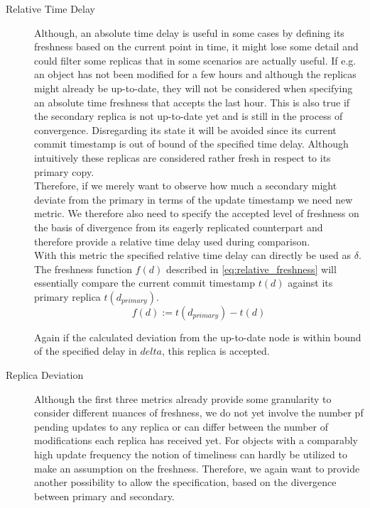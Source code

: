 \begin{description}
    \item [Relative Time Delay] 
    Although, an absolute time delay is useful in some cases by defining its freshness based on the current point in time, 
    it might lose some detail and could filter some replicas that in some scenarios are actually useful.
    If e.g. an object has not been modified for a few hours and although the replicas might already be up-to-date, they will not be considered when specifying 
    an absolute time freshness that accepts the last hour.
    This is also true if the secondary replica is not up-to-date yet and is still in the process of convergence.
    Disregarding its state it will be avoided since its current commit timestamp is out of bound of the specified time delay.
    Although intuitively these replicas are considered rather fresh in respect to its primary copy.\\
    Therefore, if we merely want to observe how much a secondary might deviate from the primary in terms of the update timestamp we need new metric.
    We therefore also need to specify the accepted level of freshness on the basis of divergence from its eagerly replicated counterpart and therefore provide a relative time delay
    used during comparison.\\
    With this metric the specified relative time delay can directly be used as $\delta$. The freshness function $f(d)$ described in \ref{eq:relative_freshness}
    will essentially compare the current commit timestamp $t(d)$ against its primary replica $t(d_{primary})$.
        \begin{equation} \label{eq:relative_freshness}
            f(d) := t(d_{primary}) - t(d)
        \end{equation}

    Again if the calculated deviation from the up-to-date node is within bound of the specified delay in $delta$, this replica is accepted.



    \item [Replica Deviation] Although the first three metrics already provide some granularity to consider different nuances of freshness, we 
        do not yet involve the number pf pending updates to any replica or can differ between the number of modifications each replica has received yet.
        For objects with a comparably high update frequency the notion of timeliness can hardly be utilized to make an assumption on the freshness.
        Therefore, we again want to provide another possibility to allow the specification, based on the divergence between primary and secondary.


\end{description}
